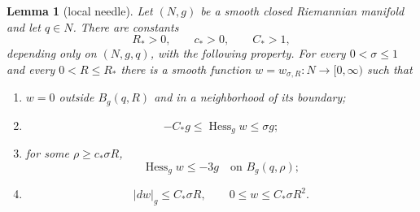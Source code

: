 \documentclass[11pt]{amsart}
\newtheorem{lemma}[theorem]{Lemma}
\theoremstyle{definition}
\newcommand{\Hess}{\operatorname{Hess}}
\begin{document}
\begin{lemma}[local needle]\label{lem:needle}
Let $(N,g)$ be a smooth closed Riemannian manifold and let $q\in N$.  There are constants
\[
 R_*>0,\qquad c_*>0,\qquad C_*>1,
\]
depending only on $(N,g,q)$, with the following property.  For every
$0<\sigma\le1$ and every $0<R\le R_*$ there is a smooth function
$w=w_{\sigma,R}:N\to[0,\infty)$ such that
\begin{enumerate}[label=\textup{(\roman*)}]
 \item $w=0$ outside $B_g(q,R)$ and in a neighborhood of its boundary;
 \item
 \[
  -C_*g\le\Hess_g w\le\sigma g;
 \]
 \item for some $\rho\ge c_*\sigma R$,
 \[
  \Hess_g w\le-3g
  \quad\text{on }B_g(q,\rho);
 \]
 \item
 \[
  |dw|_g\le C_*\sigma R,
  \qquad
  0\le w\le C_*\sigma R^2.
 \]
\end{enumerate}
\end{lemma}
\end{document}
